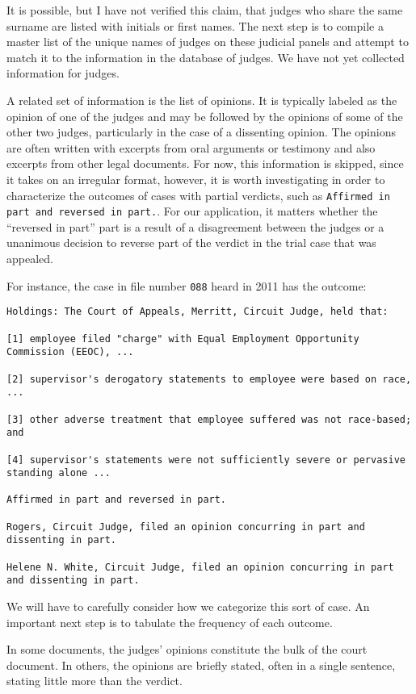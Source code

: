 \documentclass[11pt]{paper}
\begin{document}
It is possible, but I have not verified this claim, that judges who share the same surname
are listed with initials or first names. 
The next step is to compile a master list of the unique names of judges on these judicial panels
and attempt to match it to the information in the database of judges. 
We have not yet collected information for judges. 

A related set of information is the list of opinions. 
It is typically labeled as the opinion of one of the judges
and may be followed by the opinions of some of the other two judges, 
particularly in the case of a dissenting opinion. 
The opinions are often written with excerpts from oral arguments or testimony
and also excerpts from other legal documents. 
For now, this information is skipped, since it takes on an irregular format, 
however, it is worth investigating in order to characterize the outcomes of cases with partial verdicts, 
such as \texttt{Affirmed in part and reversed in part.}. 
For our application, it matters whether the ``reversed in part'' part is a result of a disagreement between the judges 
or a unanimous decision to reverse part of the verdict in the trial case that was appealed. 

For instance, the case in file number \texttt{088} heard in 2011 has the outcome:
%
\begin{verbatim}
Holdings: The Court of Appeals, Merritt, Circuit Judge, held that:
 
[1] employee filed "charge" with Equal Employment Opportunity Commission (EEOC), ...
 
[2] supervisor's derogatory statements to employee were based on race, ...
 
[3] other adverse treatment that employee suffered was not race-based; and
 
[4] supervisor's statements were not sufficiently severe or pervasive standing alone ...
 
Affirmed in part and reversed in part.
 
Rogers, Circuit Judge, filed an opinion concurring in part and dissenting in part.
 
Helene N. White, Circuit Judge, filed an opinion concurring in part and dissenting in part.
\end{verbatim}
%
We will have to carefully consider how we categorize this sort of case. 
An important next step is to tabulate the frequency of each outcome. 

In some documents, the judges' opinions constitute the bulk of the court document. 
In others, the opinions are briefly stated, often in a single sentence, 
stating little more than the verdict. 
\end{document}
